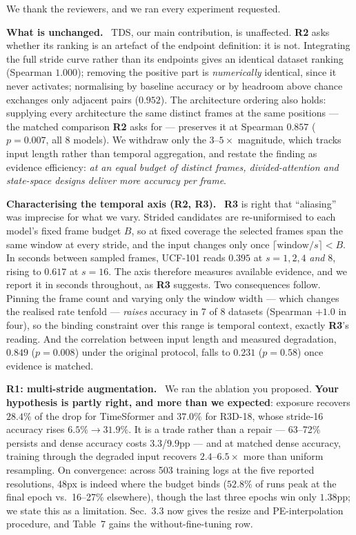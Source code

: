 \documentclass[runningheads]{llncs}
\newcommand{\R}[1]{\textbf{R#1}}
\newcommand{\TDS}{\textsc{TDS}}
\newcommand{\head}[1]{\vspace{1pt}\noindent\textbf{#1}\ }
\begin{document}
\pagestyle{empty}

We thank the reviewers, and we ran every experiment requested.

\head{What is unchanged.}
\TDS{}, our main contribution, is unaffected. \R{2} asks whether its ranking is
an artefact of the endpoint definition: it is not. Integrating the full stride
curve rather than its endpoints gives an identical dataset ranking (Spearman
$1.000$); removing the positive part is \emph{numerically} identical, since it
never activates; normalising by baseline accuracy or by headroom above chance
exchanges only adjacent pairs ($0.952$). The architecture ordering also holds:
supplying every architecture the same distinct frames at the same positions ---
the matched comparison \R{2} asks for --- preserves it at Spearman $0.857$
($p{=}0.007$, all 8 models). We withdraw only the $3$--$5\times$ magnitude,
which tracks input length rather than temporal aggregation, and restate the
finding as evidence efficiency: \emph{at an equal budget of distinct frames,
divided-attention and state-space designs deliver more accuracy per frame}.

\head{Characterising the temporal axis (\R{2}, \R{3}).}
\R{3} is right that ``aliasing'' was imprecise for what we vary. Strided
candidates are re-uniformised to each model's fixed frame budget $B$, so at
fixed coverage the selected frames span the same window at every stride, and
the input changes only once $\lceil\text{window}/s\rceil<B$. In seconds between
sampled frames, UCF-101 reads $0.395$ at $s{=}1,2,4$ \emph{and} $8$, rising to
$0.617$ at $s{=}16$. The axis therefore measures available evidence, and we
report it in seconds throughout, as \R{3} suggests. Two consequences follow.
Pinning the frame count and varying only the window width --- which changes the
realised rate tenfold --- \emph{raises} accuracy in 7 of 8 datasets (Spearman
$+1.0$ in four), so the binding constraint over this range is temporal context,
exactly \R{3}'s reading. And the correlation between input length and measured
degradation, $0.849$ ($p{=}0.008$) under the original protocol, falls to
$0.231$ ($p{=}0.58$) once evidence is matched.

\head{\R{1}: multi-stride augmentation.}
We ran the ablation you proposed. \textbf{Your hypothesis is partly right, and
more than we expected}: exposure recovers $28.4\%$ of the drop for TimeSformer
and $37.0\%$ for R3D-18, whose stride-16 accuracy rises $6.5\%\!\to\!31.9\%$. It
is a trade rather than a repair --- 63--72\% persists and dense accuracy costs
$3.3$/$9.9$pp --- and at matched dense accuracy, training through the degraded
input recovers $2.4$--$6.5\times$ more than uniform resampling. On convergence:
across 503 training logs at the five reported resolutions, 48px is indeed where the budget binds ($52.8\%$ of
runs peak at the final epoch vs.\ 16--27\% elsewhere), though the last three
epochs win only $1.38$pp; we state this as a limitation. Sec.~3.3 now gives the
resize and PE-interpolation procedure, and Table~7 gains the
without-fine-tuning row.
\end{document}
